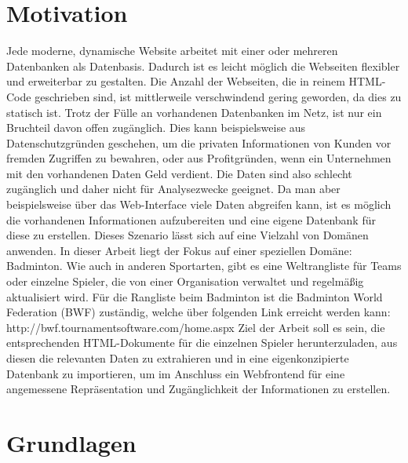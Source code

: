 \documentclass[12pt,a4paper]{article}
\begin{document}
 
\newpage

\tableofcontents 
\newpage

\section{Motivation}
Jede moderne, dynamische Website arbeitet mit einer oder mehreren Datenbanken als Datenbasis. Dadurch ist es leicht möglich die Webseiten flexibler und erweiterbar zu gestalten. Die Anzahl der Webseiten, die in reinem HTML-Code geschrieben sind, ist mittlerweile verschwindend gering geworden, da dies zu statisch ist. Trotz der Fülle an vorhandenen Datenbanken im Netz, ist nur ein Bruchteil davon offen zugänglich. Dies kann beispielsweise aus Datenschutzgründen geschehen, um die privaten Informationen von Kunden vor fremden Zugriffen zu bewahren, oder aus Profitgründen, wenn ein Unternehmen mit den vorhandenen Daten Geld verdient. 
\newline \newline
Die Daten sind also schlecht zugänglich und daher nicht für Analysezwecke geeignet. Da man aber beispielsweise über das Web-Interface viele Daten abgreifen kann, ist es möglich die vorhandenen Informationen aufzubereiten und eine eigene Datenbank für diese zu erstellen. Dieses Szenario lässt sich auf eine Vielzahl von Domänen anwenden. In dieser Arbeit liegt der Fokus auf einer speziellen Domäne: Badminton. Wie auch in anderen Sportarten, gibt es eine Weltrangliste für Teams oder einzelne Spieler, die von einer Organisation verwaltet und regelmäßig aktualisiert wird. Für die Rangliste beim Badminton ist die Badminton World Federation (BWF) zuständig, welche über folgenden Link erreicht werden kann: http://bwf.tournamentsoftware.com/home.aspx \cite{BWF2015}
\newline \newline
Ziel der Arbeit soll es sein, die entsprechenden HTML-Dokumente für die einzelnen Spieler herunterzuladen, aus diesen die relevanten Daten zu extrahieren und in eine eigenkonzipierte Datenbank zu importieren, um im Anschluss ein Webfrontend für eine angemessene Repräsentation und Zugänglichkeit der Informationen zu erstellen.
\newpage

\section{Grundlagen}
\end{document}
